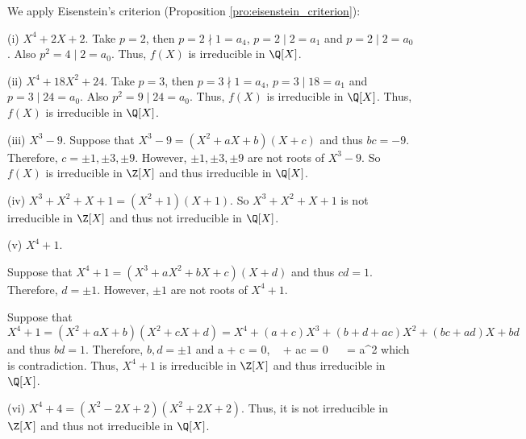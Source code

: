 \begin{solution}[\bf Solution.]
We apply Eisenstein's criterion (Proposition \ref{pro:eisenstein_criterion}):
\ben
\item [(i)] $X^4 + 2X + 2$. Take $p = 2$, then $p = 2 \nmid 1 = a_4$, $p = 2 \mid 2 = a_1$ and $p = 2\mid 2 = a_0$. Also $p^2 = 4 \mid 2 = a_0$. Thus, $f(X)$ is irreducible in $\Q[X]$.

\item [(ii)] $X^4 + 18X^2 + 24$. Take $p = 3$, then $p = 3 \nmid 1 = a_4$, $p = 3 \mid 18 = a_1$ and $p = 3\mid 24 = a_0$. Also $p^2 = 9 \mid 24 = a_0$.  Thus, $f(X)$ is irreducible in $\Q[X]$. Thus, $f(X)$ is irreducible in $\Q[X]$.

\item [(iii)] $X^3 - 9$. Suppose that $X^3 - 9 = (X^2 + aX + b)(X + c)$ and thus $bc = -9$. Therefore, $c = \pm 1,\pm 3,\pm 9$. However, $\pm 1,\pm 3,\pm 9$ are not roots of $X^3 - 9$. So $f(X)$ is irreducible in $\Z[X]$ and thus irreducible in $\Q[X]$.

\item [(iv)] $X^3 + X^2 + X + 1 = (X^2 + 1)(X+1)$. So $X^3 + X^2 + X + 1$ is not irreducible in $\Z[X]$ and thus not irreducible in $\Q[X]$.

\item [(v)] $X^4 + 1$.

Suppose that $X^4 +1 = (X^3 + aX^2 + bX + c)(X + d)$ and thus $cd = 1$. Therefore, $d = \pm 1$. However, $\pm 1$ are not roots of $X^4 +1$.

Suppose that $X^4 +1 = (X^2 + aX + b)(X^2 + cX + d) = X^4 + (a+c)X^3 + (b+d + ac)X^2 + (bc + ad)X + bd$ and thus $bd = 1$. Therefore, $b,d = \pm 1$ and
\be
a + c = 0, \  + ac = 0 \ \ra \  = a^2
\ee
which is contradiction. Thus, $X^4 + 1$ is irreducible in $\Z[X]$ and thus irreducible in $\Q[X]$.

\item [(vi)] $X^4 + 4 = (X^2 - 2X + 2)(X^2 + 2X + 2)$. Thus, it is not irreducible in $\Z[X]$ and thus not irreducible in $\Q[X]$.
\een
\end{solution}


